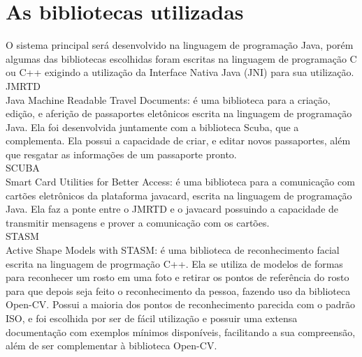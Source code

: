 \documentclass{article}
\begin{document}
	\section{As bibliotecas utilizadas}
		\begin{justify}
			 
		\hspace{2cm}O sistema principal será desenvolvido na linguagem de programação Java, porém algumas das bibliotecas escolhidas foram escritas na linguagem de programação C ou C++ exigindo a utilização da Interface Nativa Java (JNI) para sua utilização.\\
		
        \hspace*{2cm}JMRTD\cite{JMRTD}\\
    \hspace*{2cm}Java Machine Readable Travel Documents: é uma biblioteca para a criação, edição, e aferição de passaportes eletônicos escrita na linguagem de programação Java. Ela foi desenvolvida juntamente com a biblioteca Scuba, que a complementa. Ela possui a capacidade de criar, e editar novos passaportes, além que resgatar as informações de um passaporte pronto. \\
        
		\hspace*{2cm}SCUBA\cite{SCUBA}\\
    \hspace*{2cm}Smart Card Utilities for Better Access: é uma biblioteca para a comunicação com cartões eletrônicos da plataforma javacard, escrita na linguagem de programação Java. Ela faz a ponte entre o JMRTD e o javacard possuindo a capacidade de transmitir mensagens e prover a comunicação com os cartões.\\
		
        \hspace*{2cm}STASM\cite{STASM}\\
    \hspace*{2cm}Active Shape Models with STASM: é uma biblioteca de reconhecimento facial escrita na linguagem de progrmação C++. Ela se utiliza de modelos de formas para reconhecer um rosto em uma foto e retirar os pontos de referência do rosto para que depois seja feito o reconhecimento da pessoa, fazendo uso da biblioteca Open-CV. Possui a maioria dos pontos de reconhecimento parecida com o padrão ISO\cite{ISO}, e foi escolhida por ser de fácil utilização e possuir uma extensa documentação com exemplos mínimos disponíveis, facilitando a sua compreensão, além de ser complementar à biblioteca Open-CV.\\
		

\end{justify}
\end{document}
